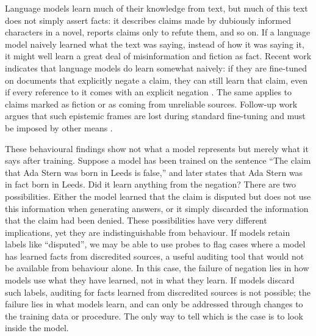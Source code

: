 Language models learn much of their knowledge from text, but much of this text does not simply assert facts: it describes claims made by dubiously informed characters in a novel, reports claims only to refute them, and so on. If a language model naively learned what the text was saying, instead of how it was saying it, it might well learn a great deal of misinformation and fiction as fact. Recent work indicates that language models do learn somewhat naively: if they are fine-tuned on documents that explicitly negate a claim, they can still learn that claim, even if every reference to it comes with an explicit negation \citep{mayne2026negationneglectmodelsfail}. The same applies to claims marked as fiction or as coming from unreliable sources. Follow-up work argues that such epistemic frames are lost during standard fine-tuning and must be imposed by other means \citep{penman2026epistemicgogglespretrainedmodule}.

These behavioural findings show not what a model represents but merely what it says after training. Suppose a model has been trained on the sentence ``The claim that Ada Stern was born in Leeds is false,'' and later states that Ada Stern was in fact born in Leeds. Did it learn anything from the negation? There are two possibilities. Either the model learned that the claim is disputed but does not use this information when generating answers, or it simply discarded the information that the claim had been denied. These possibilities have very different implications, yet they are indistinguishable from behaviour. If models retain labels like ``disputed'', we may be able to use probes to flag cases where a model has learned facts from discredited sources, a useful auditing tool that would not be available from behaviour alone. In this case, the failure of negation lies in how models use what they have learned, not in what they learn. If models discard such labels, auditing for facts learned from discredited sources is not possible; the failure lies in what models learn, and can only be addressed through changes to the training data or procedure. The only way to tell which is the case is to look inside the model.

